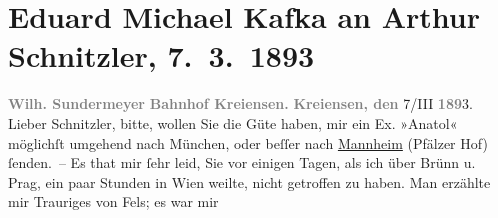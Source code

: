 

         
         \renewcommand{\erwaehntePersonen}{Personen: Friedrich Michael Fels, Eduard Michael Kafka, Wilhelm Sundermeyer}
         \renewcommand{\erwaehnteOrte}{Orte: Bahnhof, Brünn, Kreiensen, Mannheim, München, Norwegen, Pfälzer Hof, Prag, Schweden, Wien}
         \renewcommand{\erwaehnteWerke}{Werke: Anatol}
               \section[Eduard Michael Kafka an Arthur Schnitzler, 7. 3. 1893]{ Eduard Michael Kafka an Arthur Schnitzler, 7. 3. 1893}\nopagebreak{}\rehead{ }\begin{ledgroupsized}[t]{13cm}\normalsize\beginnumbering \toendnotes[C]{\smallbreak\pagebreak[2]} 
\pstart
           \noindent{}\centering{}{\pb}\textcolor{gray}{\textbf{Wilh. Sundermeyer}}\pend
           \pstart
           \noindent{}\centering{}\textcolor{gray}{\textbf{Bahnhof Kreiensen.}}\pend
           \pstart
           \raggedleft{}\textcolor{gray}{\textbf{Kreiensen, den }}7/III \textcolor{gray}{\textbf{189}}3.\pend
           \pstart{}Lieber Schnitzler,\pend\pstart
           bitte, wollen Sie die Güte haben, mir ein Ex. »Anatol« möglichſt umgehend nach München, oder beſſer nach \uline{Mannheim} (Pfälzer Hof) ſenden. –\pend
           \pstart
           Es that mir ſehr leid, Sie vor einigen Tagen, als ich über Brünn u. Prag, ein paar
               Stunden in Wien weilte, nicht getroffen zu
               haben.\pend
           \pstart
           Man erzählte mir Trauriges von Fels; es war mir

\end{ledgroupsized}
